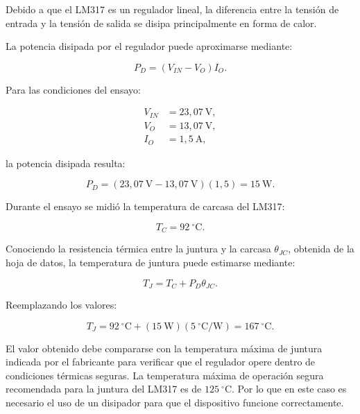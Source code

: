 \documentclass[12pt,a4paper]{article}
\begin{document}
	Debido a que el LM317 es un regulador lineal, la diferencia entre la tensión de
	entrada y la tensión de salida se disipa principalmente en forma de calor.
	
	La potencia disipada por el regulador puede aproximarse mediante:
	
	\begin{equation}
		P_D
		=
		(V_{IN}-V_O)I_O.
	\end{equation}
	
	Para las condiciones del ensayo:
	
	\begin{align}
		V_{IN} &= 23,07~\text{V},
		\\
		V_O &= 13,07~\text{V},
		\\
		I_O &= 1,5~\text{A},
	\end{align}
	
	la potencia disipada resulta:
	
	\begin{equation}
		P_D
		=
		\left(
		23,07~\text{V}
		-
		13,07~\text{V}
		\right)
		(1,5)
		=
		15~\text{W}.
	\end{equation}
	
	Durante el ensayo se midió la temperatura de carcasa del LM317:
	
	\begin{equation}
		T_C
		=
		92~^\circ\text{C}.
	\end{equation}
	
	Conociendo la resistencia térmica entre la juntura y la carcasa
	$\theta_{JC}$, obtenida de la hoja de datos, la temperatura de juntura puede
	estimarse mediante:
	
	\begin{equation}
		T_J
		=
		T_C
		+
		P_D\theta_{JC}.
	\end{equation}
	
	Reemplazando los valores:
	
	\begin{equation}
		T_J
		=
		92~^\circ\text{C}
		+
		\left(
		15~\text{W}
		\right)
		\left(
		5~^\circ\text{C/W}
		\right)
		=
		167~^\circ\text{C}.
	\end{equation}
	
	El valor obtenido debe compararse con la temperatura máxima de juntura indicada
	por el fabricante para verificar que el regulador opere dentro de condiciones
	térmicas seguras.
    La temperatura máxima de operación segura recomendada para la juntura del LM317 es de $125~^\circ\text{C}$. Por lo que en este caso es necesario el uso de un disipador para que el dispositivo funcione correctamente. 
	
\end{document}
